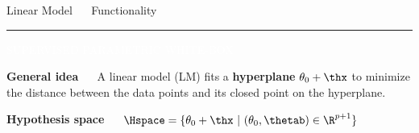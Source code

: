 \documentclass[11pt,compress,t,notes=noshow, xcolor=table]{beamer}
\begin{document}

\LARGE
\begin{frame}{\textcolor{gray!80}{Linear Model} ~~ Functionality}
\normalsize
\vspace{-0.5cm}
\noindent \textcolor{gray!80}{\rule{\textwidth}{1pt}}

\vspace{0.3cm}

\footnotesize

\colorbox{gray!80}{\textcolor{white}{SUPERVISED}} 
\colorbox{gray!80}{\textcolor{white}{PARAMETRIC}} 
\colorbox{gray!80}{\textcolor{white}{WHITE-BOX}}

\medskip

\textbf{\textcolor{gray!80}{General idea}} ~~  
A linear model (LM) fits a \textbf{hyperplane} $\theta_0 + \thx$ to minimize the distance between the data points and its closed point on the hyperplane. 

\medskip

\textbf{\textcolor{gray!80}{Hypothesis space}} ~~
$\Hspace = \{ \theta_0 + \thx\ |\ (\theta_0, \thetab) \in \R^{p+1} \}$




\end{frame}
\end{document}

